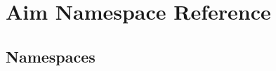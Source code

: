 \hypertarget{namespace_aim}{}\section{Aim Namespace Reference}
\label{namespace_aim}
\subsection*{Namespaces}
\begin{DoxyCompactItemize}
\end{DoxyCompactItemize}
